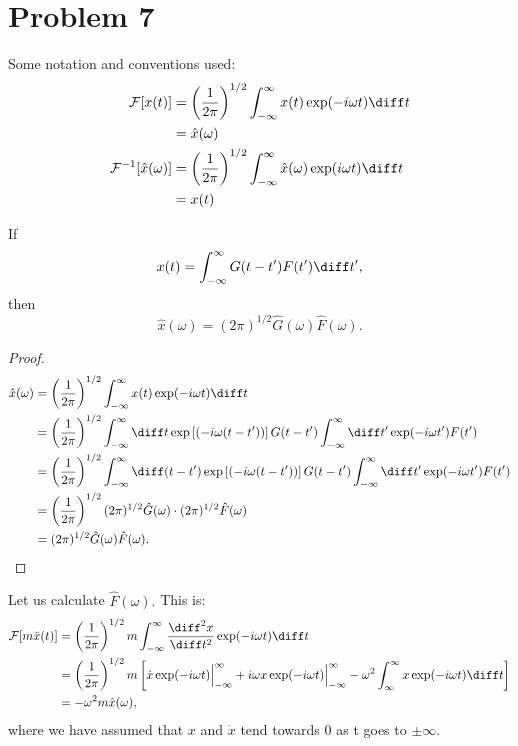 \documentclass[12pt]{article}
\title{}
\date{}
\author{Jacob H. Nie}
\begin{document}
\section*{Problem 7}

Some notation and conventions used:
\begin{align*}
	\mathcal{F}[x(t)]  &= \left(\frac{1}{2\pi}\right)^{1/2} \int_{-\infty}^{\infty} x(t) \exp(-i\omega t)\diff t \\
		    &= \hat{x}(\omega) \\
	\mathcal{F}^{-1}[\hat{x}(\omega)] &= \left( \frac{1}{2\pi} \right)^{1/2} \int_{-\infty}^{\infty} \hat{x}(\omega) \exp(i\omega t)\diff t \\
					  &= x(t)
\end{align*}

\begin{theorem}
	If \[
		x(t) = \int_{-\infty}^{\infty} G(t-t')F(t') \diff t',
	\] 
	then \[
		\hat{x}(\omega) = (2\pi)^{1/2}\hat{G}(\omega) \hat{F}(\omega).	
	\] 

\end{theorem}

\begin{proof}
	\begin{align*}
		\hat{x}(\omega)  &= \left(\frac{1}{2\pi}\right)^{1/2} \int_{-\infty}^{\infty} x(t) \exp(-i\omega t)\diff t \\
				 &= \left(\frac{1}{2\pi}\right)^{1/2} \int_{-\infty}^{\infty} \diff t \exp\left[\left(-i\omega(t-t')\right)\right] G(t-t') \int_{-\infty}^{\infty} \diff t' \exp(-i\omega t') F(t') \\ 
				 &= \left(\frac{1}{2\pi}\right)^{1/2} \int_{-\infty}^{\infty} \diff (t-t') \exp\left[\left(-i\omega(t-t')\right)\right] G(t-t') \int_{-\infty}^{\infty} \diff t' \exp(-i\omega t') F(t') \\
				 &= \left(\frac{1}{2\pi}\right)^{1/2} (2\pi)^{1/2} \hat{G}(\omega)\cdot (2\pi)^{1/2} \hat{F}(\omega) \\
				 &= (2\pi)^{1/2}\hat{G}(\omega) \hat{F}(\omega).
	\end{align*}
\end{proof}

Let us calculate $\hat{F}(\omega).$  This is:
\begin{align*}
	\mathcal{F}[m\ddot{x}(t)] &= \left(\frac{1}{2\pi}\right)^{1/2} m \int_{-\infty}^{\infty} \frac{\diff^{2}x}{\diff t^{2}} \exp(-i\omega t)\diff t \\
				  &= \left(\frac{1}{2\pi}\right)^{1/2}m\left[\dot{x}\exp(-i\omega t)\Big|_{-\infty}^{\infty} + i\omega x \exp(-i\omega t)\Big|_{-\infty}^{\infty} - \omega^2 \int_{\infty}^{\infty} x \exp(-i\omega t)\diff t \right] \\
				  &= -\omega ^2 m \hat{x}(\omega),
\end{align*}
where we have assumed that $x$ and $\dot{x}$ tend towards 0 as t goes to $\pm \infty$.
\end{document}

